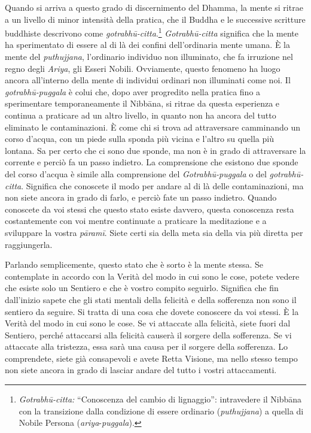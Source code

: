 Quando si arriva a questo grado di discernimento del Dhamma, la mente si
ritrae a un livello di minor intensità della pratica, che il Buddha e le
successive scritture buddhiste descrivono come
\emph{gotrabhū-citta}.\footnote{\emph{Gotrabhū-citta:} ``Conoscenza del
  cambio di lignaggio'': intravedere il Nibbāna con la
  transizione dalla condizione di essere ordinario (\emph{puthujjana}) a
  quella di Nobile Persona (\emph{ariya}-\emph{puggala}).}
\emph{Gotrabhū-citta} significa che la mente ha sperimentato di essere
al di là dei confini dell'ordinaria mente umana. È la mente del
\emph{puthujjana}, l'ordinario individuo non illuminato, che fa
irruzione nel regno degli \emph{Ariya}, gli Esseri Nobili. Ovviamente,
questo fenomeno ha luogo ancora all'interno della mente di individui
ordinari non illuminati come noi. Il \emph{gotrabhū-puggala} è colui
che, dopo aver progredito nella pratica fino a sperimentare
temporaneamente il Nibbāna, si ritrae da questa esperienza e
continua a praticare ad un altro livello, in quanto non ha ancora del
tutto eliminato le contaminazioni. È come chi si trova ad attraversare
camminando un corso d'acqua, con un piede sulla sponda più vicina e
l'altro su quella più lontana. Sa per certo che ci sono due sponde, ma
non è in grado di attraversare la corrente e perciò fa un passo
indietro. La comprensione che esistono due sponde del corso d'acqua è
simile alla comprensione del \emph{Gotrabhū-puggala} o del
\emph{gotrabhū-citta}. Significa che conoscete il modo per andare al di
là delle contaminazioni, ma non siete ancora in grado di farlo, e perciò
fate un passo indietro. Quando conoscete da voi stessi che questo stato
esiste davvero, questa conoscenza resta costantemente con voi mentre
continuate a praticare la meditazione e a sviluppare la vostra
\emph{pāramī}. Siete certi sia della meta sia della via più diretta per
raggiungerla.

Parlando semplicemente, questo stato che è sorto è la mente stessa. Se
contemplate in accordo con la Verità del modo in cui sono le cose,
potete vedere che esiste solo un Sentiero e che è vostro compito
seguirlo. Significa che fin dall'inizio sapete che gli stati mentali
della felicità e della sofferenza non sono il sentiero da seguire. Si
tratta di una cosa che dovete conoscere da voi stessi. È la Verità del
modo in cui sono le cose. Se vi attaccate alla felicità, siete fuori dal
Sentiero, perché attaccarsi alla felicità causerà il sorgere della
sofferenza. Se vi attaccate alla tristezza, essa sarà una causa per il
sorgere della sofferenza. Lo comprendete, siete già consapevoli e avete
Retta Visione, ma nello stesso tempo non siete ancora in grado di
lasciar andare del tutto i vostri attaccamenti.

